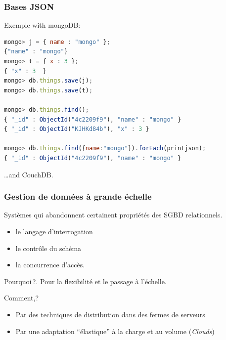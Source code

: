 \begin{frame}[fragile]
\frametitle{Bases JSON}

Exemple with mongoDB:

\begin{lstlisting}[language=JavaScript]
mongo> j = { name : "mongo" };
{"name" : "mongo"}
mongo> t = { x : 3 };
{ "x" : 3  }
mongo> db.things.save(j);
mongo> db.things.save(t);

mongo> db.things.find();
{ "_id" : ObjectId("4c2209f9"), "name" : "mongo" }
{ "_id" : ObjectId("KJHKd84b"), "x" : 3 }

mongo> db.things.find({name:"mongo"}).forEach(printjson);
{ "_id" : ObjectId("4c2209f9"), "name" : "mongo" }
\end{lstlisting}

\ldots and CouchDB.
\end{frame}


\begin{frame}
\frametitle{Gestion de données à grande échelle}

Systèmes qui \alert{abandonnent} certainent propriétés des SGBD relationnels.

\begin{itemize}
  \item le langage d'interrogation
  \item le contrôle du schéma
  \item la concurrence d'accès.
\end{itemize}

\alert{Pourquoi\,?}. Pour la \alert{flexibilité} et le \alert{passage à l'échelle}.

\vfill
\alert{Comment,?} 

\begin{itemize}
  \item Par des techniques de distribution dans des fermes de serveurs
  \item Par une adaptation ``élastique'' à la charge et au volume (\textit{Clouds})
\end{itemize}
\end{frame}


